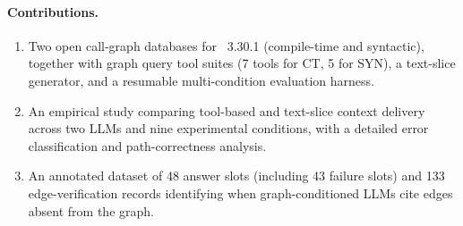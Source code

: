 \paragraph{Contributions.}
\begin{enumerate}
  \item Two open call-graph databases for \sqlite~3.30.1 (compile-time and
    syntactic), together with graph query tool suites (7 tools for CT, 5 for SYN),
    a text-slice generator, and a resumable multi-condition evaluation harness.
  \item An empirical study comparing tool-based and text-slice context delivery
    across two LLMs and nine experimental conditions, with a detailed error
    classification and path-correctness analysis.
  \item An annotated dataset of 48 answer slots (including 43 failure slots) and 133
    edge-verification records identifying when graph-conditioned LLMs cite edges
    absent from the graph.
\end{enumerate}
